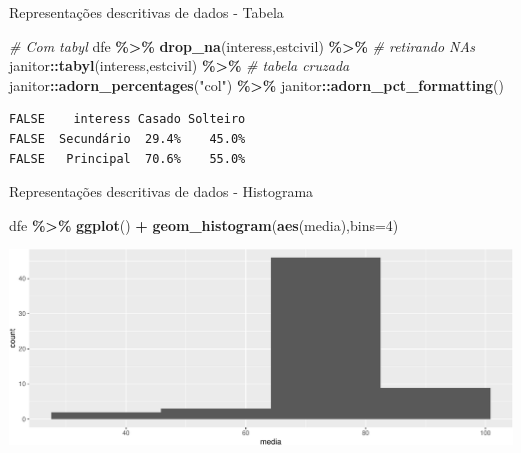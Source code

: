 \documentclass[
  9pt,
  ignorenonframetext,
  aspectratio=169]{beamer}
\newenvironment{Shaded}{\begin{snugshade}}{\end{snugshade}}
\newcommand{\CommentTok}[1]{\textcolor[rgb]{0.56,0.35,0.01}{\textit{#1}}}
\newcommand{\DataTypeTok}[1]{\textcolor[rgb]{0.13,0.29,0.53}{#1}}
\newcommand{\DecValTok}[1]{\textcolor[rgb]{0.00,0.00,0.81}{#1}}
\newcommand{\KeywordTok}[1]{\textcolor[rgb]{0.13,0.29,0.53}{\textbf{#1}}}
\newcommand{\NormalTok}[1]{#1}
\newcommand{\OperatorTok}[1]{\textcolor[rgb]{0.81,0.36,0.00}{\textbf{#1}}}
\newcommand{\StringTok}[1]{\textcolor[rgb]{0.31,0.60,0.02}{#1}}
\begin{document}
\begin{frame}[fragile]{Representações descritivas de dados - Tabela}
\protect\hypertarget{representauxe7uxf5es-descritivas-de-dados---tabela}{}
\begin{Shaded}
\begin{Highlighting}[]
\CommentTok{\# Com tabyl}
\NormalTok{dfe }\OperatorTok{\%\textgreater{}\%}
\StringTok{  }\KeywordTok{drop\_na}\NormalTok{(interess,estcivil) }\OperatorTok{\%\textgreater{}\%}\StringTok{ }\CommentTok{\# retirando NAs}
\StringTok{  }\NormalTok{janitor}\OperatorTok{::}\KeywordTok{tabyl}\NormalTok{(interess,estcivil) }\OperatorTok{\%\textgreater{}\%}\StringTok{ }\CommentTok{\# tabela cruzada}
\StringTok{  }\NormalTok{janitor}\OperatorTok{::}\KeywordTok{adorn\_percentages}\NormalTok{(}\StringTok{"col"}\NormalTok{) }\OperatorTok{\%\textgreater{}\%}
\StringTok{  }\NormalTok{janitor}\OperatorTok{::}\KeywordTok{adorn\_pct\_formatting}\NormalTok{()}
\end{Highlighting}
\end{Shaded}

\begin{verbatim}
FALSE    interess Casado Solteiro
FALSE  Secundário  29.4%    45.0%
FALSE   Principal  70.6%    55.0%
\end{verbatim}
\end{frame}

\begin{frame}[fragile]{Representações descritivas de dados - Histograma}
\protect\hypertarget{representauxe7uxf5es-descritivas-de-dados---histograma}{}
\begin{Shaded}
\begin{Highlighting}[]
\NormalTok{dfe }\OperatorTok{\%\textgreater{}\%}
\StringTok{  }\KeywordTok{ggplot}\NormalTok{() }\OperatorTok{+}
\StringTok{  }\KeywordTok{geom\_histogram}\NormalTok{(}\KeywordTok{aes}\NormalTok{(media),}\DataTypeTok{bins=}\DecValTok{4}\NormalTok{)}
\end{Highlighting}
\end{Shaded}

\includegraphics{aula_08_files/figure-beamer/unnamed-chunk-5-1.pdf}
\end{frame}
\end{document}
